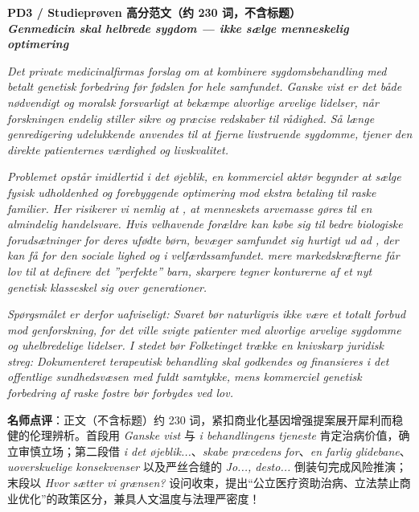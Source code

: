 \begin{answerbox}
\textbf{PD3 / Studieprøven 高分范文（约 230 词，不含标题）}\\
\textit{\textbf{Genmedicin skal helbrede sygdom --- ikke sælge menneskelig optimering}}

\textit{Det private medicinalfirmas forslag om at kombinere sygdomsbehandling med betalt genetisk forbedring før fødslen  for hele samfundet. Ganske vist er det både nødvendigt og moralsk forsvarligt at bekæmpe alvorlige arvelige lidelser, når forskningen endelig stiller sikre og præcise redskaber til rådighed. Så længe genredigering udelukkende anvendes  til at fjerne livstruende sygdomme, tjener den direkte patienternes værdighed og livskvalitet.}

\textit{Problemet opstår imidlertid i det øjeblik, en kommerciel aktør begynder at sælge fysisk udholdenhed og forebyggende optimering mod ekstra betaling til raske familier. Her risikerer vi nemlig at , at menneskets arvemasse gøres til en almindelig handelsvare. Hvis velhavende forældre kan købe sig til bedre biologiske forudsætninger for deres ufødte børn, bevæger samfundet sig hurtigt ud ad , der kan få  for den sociale lighed og  i velfærdssamfundet.  mere markedskræfterne får lov til at definere det ”perfekte” barn,  skarpere tegner konturerne af et nyt genetisk klasseskel sig over generationer.}

\textit{Spørgsmålet er derfor uafviseligt:  Svaret bør naturligvis ikke være et totalt forbud mod genforskning, for det ville svigte patienter med alvorlige arvelige sygdomme og uhelbredelige lidelser. I stedet bør Folketinget trække en knivskarp juridisk streg: Dokumenteret terapeutisk behandling skal godkendes og finansieres i det offentlige sundhedsvæsen med fuldt samtykke, mens kommerciel genetisk forbedring af raske fostre bør forbydes ved lov.}

\small\textbf{名师点评}：正文（不含标题）约 230 词，紧扣商业化基因增强提案展开犀利而稳健的伦理辨析。首段用 \textit{Ganske vist} 与 \textit{i behandlingens tjeneste} 肯定治病价值，确立审慎立场；第二段借 \textit{i det øjeblik...}、\textit{skabe præcedens for}、\textit{en farlig glidebane}、\textit{uoverskuelige konsekvenser} 以及严丝合缝的 \textit{Jo..., desto...} 倒装句完成风险推演；末段以 \textit{Hvor sætter vi grænsen?} 设问收束，提出“公立医疗资助治病、立法禁止商业优化”的政策区分，兼具人文温度与法理严密度！
\end{answerbox}